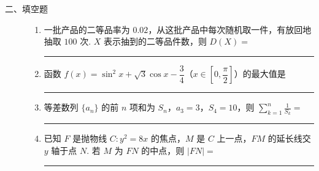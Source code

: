 \begin{description}

    \item[二、填空题]

    \begin{enumerate}[leftmargin=5pt]

      \addtocounter{enumi}{+12}

        \item 一批产品的二等品率为 \(0.02\)，从这批产品中每次随机取一件，有放回地抽取 \(100\text{ 次}\). \(X\) 表示抽到的二等品件数，则 \(D(X)=\)\rule[-0.3ex]{3em}{0.4pt}

        \item 函数 \(f(x)=\sin^2x+\sqrt3\cos x-\dfrac34\)（\(x\in\left[0,\dfrac{\pi}{2}\right]\)）的最大值是\rule[-0.3ex]{3em}{0.4pt}

        \item 等差数列 \(\{a_n\}\) 的前 \(n\) 项和为 \(S_n\)，\(a_3=3\)，\(S_4=10\)，则 \(\displaystyle \sum_{k=1}^n \frac1{S_k}=\)\rule[-0.3ex]{3em}{0.4pt}

        \item 已知 \(F\) 是抛物线 \(C:y^2=8x\) 的焦点，\(M\) 是 \(C\) 上一点，\(FM\) 的延长线交 \(y\) 轴于点 \(N\). 若 \(M\) 为 \(FN\) 的中点，则 \(|FN|=\)\rule[-0.3ex]{3em}{0.4pt}

    \end{enumerate}

\end{description}

